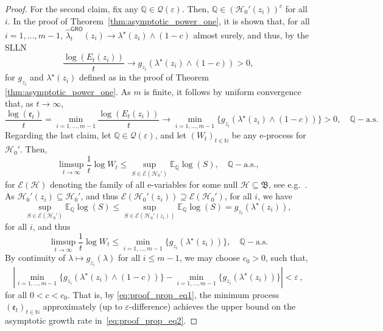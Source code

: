 \documentclass[12pt,twoside]{article}
\theoremstyle{plain}
\theoremstyle{definition}
\theoremstyle{remark}
\newcommand{\N}{\mathbb{N}}
\newcommand{\calH}{\mathcal{H}}
\newcommand{\calQ}{\mathcal{Q}}
\newcommand{\Esymb}{\mathbb{E}}
\newcommand{\Qsymb}{\mathbb{Q}}
\newcommand{\frakB}{\mathfrak{B}}
\newcommand{\e}{\mathfrak{e}}
\renewcommand{\epsilon}{\varepsilon}
\begin{document}
\begin{proof}
For the second claim, fix any $\Qsymb\in \calQ(\varepsilon)$. Then, $\Qsymb \in (\calH_0'(z_i))^c$ for all $i$. In the proof of Theorem~\ref{thm:asymptotic_power_one}, it is shown that, for all $i=1, \ldots, m-1$, $\hat{\lambda}_t^\textsf{GRO}(z_i) \to \lambda^\star(z_i) \land (1-c)$ almost surely, and thus, by the SLLN
\begin{equation*}
    \frac{\log(E_t(z_i))}{t} \to g_{z_i}(\lambda^\star(z_i) \land (1-c))>0,
\end{equation*}
for $g_{z_i}$ and $\lambda^\star(z_i)$ defined as in the proof of Theorem \ref{thm:asymptotic_power_one}. As $m$ is finite, it follows by uniform convergence that, as $t\to\infty$,
\begin{equation}\label{eq:proof_prop_eq1}
        \frac{\log(\e_t)}{t}=\min_{i=1, \ldots, m-1}\frac{\log\left(E_{t}(z_i)\right)}{t}\to \min_{i=1, \ldots, m-1}\{g_{z_i}(\lambda^\star(z_i) \land (1-c))\} >0, \quad \Qsymb-\textrm{a.s.}
    \end{equation}   
Regarding the last claim, let $\Qsymb\in \calQ(\varepsilon)$, and let $(W_t)_{t\in \N}$ be any e-process for $\calH_0'$. Then, 
\begin{equation*}
    \limsup_{t\to \infty} \frac{1}{t}\log W_t \leq \sup_{S\in \mathcal{E}(\calH_0')}\Esymb_{\Qsymb}\log(S), \quad \Qsymb-\textrm{a.s.},
\end{equation*}
for $\mathcal{E}(\calH)$ denoting the family of all e-variables for some null $\calH\subseteq \frakB$, see e.g.\ \citet[Theorem 2.1]{waudbysmith2025universal}.
As $\calH_0'(z_i) \subseteq \calH_0'$, and thus $\mathcal{E}(\calH_0'(z_i))\supseteq\mathcal{E}(\calH_0')$, for all $i$, we have
\begin{equation*}
    \sup_{S\in \mathcal{E}(\calH_0')}\Esymb_{\Qsymb}\log(S) \leq \sup_{S\in \mathcal{E}(\calH_0'(z_i))}\Esymb_{\Qsymb}\log(S)= g_{z_i}(\lambda^\star(z_i)),
\end{equation*}
for all $i$, and thus 
\begin{equation}\label{eq:proof_prop_eq2}
    \limsup_{t\to \infty} \frac{1}{t}\log W_t \leq \min_{i=1, \ldots, m-1}\{g_{z_i}(\lambda^\star(z_i))\},  \quad \Qsymb-\textrm{a.s.}
\end{equation}
By continuity of $\lambda \mapsto g_{z_i}(\lambda)$ for all $i\leq m-1$, we may choose $c_0>0$, such that, \begin{equation*}
    \left| \min_{i=1, \ldots, m-1}\{g_{z_i}(\lambda^\star(z_i) \land (1-c))\} -\min_{i=1, \ldots, m-1}\{g_{z_i}(\lambda^\star(z_i))\} \right| < \epsilon\,,
\end{equation*}for all $0<c<c_0$. That is, by \eqref{eq:proof_prop_eq1}, the minimum process $(\e_t)_{t\in \N}$ approximately (up to $\epsilon$-difference) achieves  the upper bound on the asymptotic growth rate in~\eqref{eq:proof_prop_eq2}. 
\end{proof}
\end{document}
